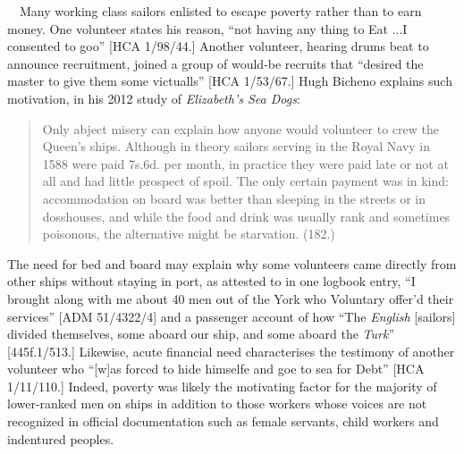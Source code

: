 \begin{styleStandard}
\ \  Many working class sailors enlisted to escape poverty rather than to earn money. One volunteer states his reason, “not having any thing to Eat ...I consented to goo” [HCA 1/98/44.] Another volunteer, hearing drums beat to announce recruitment, joined a group of would-be recruits that “desired the master to give them some victualls” [HCA 1/53/67.] Hugh Bicheno explains such motivation, in his 2012 study of \textit{Elizabeth’s Sea Dogs}:
\end{styleStandard}


\begin{quotation}
Only abject misery can explain how anyone would volunteer to crew the Queen’s ships. Although in theory sailors serving in the Royal Navy in 1588 were paid 7s.6d. per month, in practice they were paid late or not at all and had little prospect of spoil. The only certain payment was in kind: accommodation on board was better than sleeping in the streets or in dosshouses, and while the food and drink was usually rank and sometimes poisonous, the alternative might be starvation. (182.)

\end{quotation}
\begin{styleStandard}
The need for bed and board may explain why some volunteers came directly from other ships without staying in port, as attested to in one logbook entry, “I brought along with me about 40 men out of the York who Voluntary offer’d their services” [ADM 51/4322/4] and a passenger account of how “The \textit{English} [sailors] divided themselves, some aboard our ship, and some aboard the \textit{Turk}” [445f.1/513.] Likewise, acute financial need characterises the testimony of another volunteer who “[w]as forced to hide himselfe and goe to sea for Debt” [HCA 1/11/110.] Indeed, poverty was likely the motivating factor for the majority of lower-ranked men on ships in addition to those workers whose voices are not recognized in official documentation such as female servants, child workers and indentured peoples.
\end{styleStandard}


